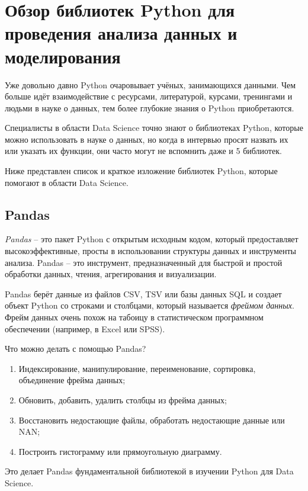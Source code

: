 \section{Обзор библиотек Python для проведения анализа данных и моделирования}

Уже довольно давно Python очаровывает учёных, занимающихся данными. Чем больше идёт взаимодействие с ресурсами, литературой, курсами, тренингами и людьми в науке о данных, тем более глубокие знания о Python приобретаются.

Специалисты в области Data Science точно знают о библиотеках Python, которые можно использовать в науке о данных, но когда в интервью просят назвать их или указать их функции, они часто могут не вспомнить даже и 5 библиотек.

Ниже представлен список и краткое изложение библиотек Python, которые помогают в области Data Science.

\subsection{Pandas}

\textit{Pandas} -- это пакет Python с открытым исходным кодом, который предоставляет высокоэффективные, просты в использовании структуры данных и инструменты анализа. Pandas -- это инструмент, предназначенный для быстрой и простой обработки данных, чтения, агрегирования и визуализации.

Pandas берёт данные из файлов CSV, TSV или базы данных SQL и создает объект Python со строками и столбцами, который называется \textit{фреймом данных}. Фрейм данных очень похож на табоицу в статистическом программном обеспечении (например, в Excel или SPSS).

Что можно делать с помощью Pandas?

\begin{enumerate}
	\item Индексирование, манипулирование, переименование, сортировка, объединение фрейма данных;
	\item Обновить, добавить, удалить столбцы из фрейма данных;
	\item Восстановить недостающие файлы, обработать недостающие данные или NAN;
	\item Построить гистограмму или прямоугольную диаграмму.
\end{enumerate}

Это делает Pandas фундаментальной библиотекой в изучении Python для Data Science.


